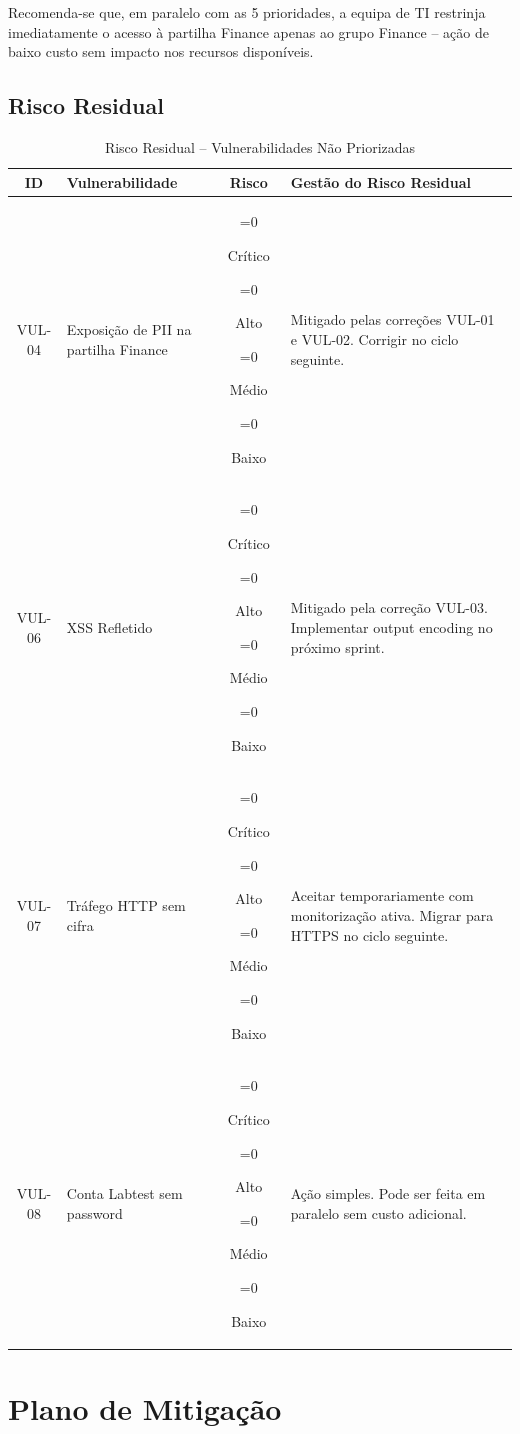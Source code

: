 \documentclass[12pt, a4paper]{report}
\newcommand{\risk}[1]{%
  \ifnum\pdfstrcmp{#1}{Critico}=0{\colorbox{Critical}{\color{white}\bfseries\footnotesize\strut~Crítico~}}\fi
  \ifnum\pdfstrcmp{#1}{Alto}=0{\colorbox{High}{\color{white}\bfseries\footnotesize\strut~Alto~}}\fi
  \ifnum\pdfstrcmp{#1}{Medio}=0{\colorbox{Medium}{\color{black}\bfseries\footnotesize\strut~Médio~}}\fi
  \ifnum\pdfstrcmp{#1}{Baixo}=0{\colorbox{Low}{\color{white}\bfseries\footnotesize\strut~Baixo~}}\fi}
\newcommand{\thead}[1]{\bfseries\small\color{white}#1}
\begin{document}
\begin{notebox}
Recomenda-se que, em paralelo com as 5 prioridades, a equipa de TI restrinja imediatamente
o acesso à partilha Finance apenas ao grupo Finance -- ação de baixo custo sem impacto nos
recursos disponíveis.
\end{notebox}

\section{Risco Residual}

\begin{table}[H]
\centering
\caption{Risco Residual -- Vulnerabilidades Não Priorizadas}
\begin{tabularx}{\linewidth}{c X c X}
\toprule
\rowcolor{TableHead}
\thead{ID} & \thead{Vulnerabilidade} & \thead{Risco} & \thead{Gestão do Risco Residual} \\
\midrule
VUL-04 & Exposição de PII na partilha Finance & \risk{Critico} &
  Mitigado pelas correções VUL-01 e VUL-02. Corrigir no ciclo seguinte. \\
\rowcolor{TableAlt}
VUL-06 & XSS Refletido & \risk{Alto} &
  Mitigado pela correção VUL-03. Implementar output encoding no próximo sprint. \\
VUL-07 & Tráfego HTTP sem cifra & \risk{Alto} &
  Aceitar temporariamente com monitorização ativa. Migrar para HTTPS no ciclo seguinte. \\
\rowcolor{TableAlt}
VUL-08 & Conta Labtest sem password & \risk{Alto} &
  Ação simples. Pode ser feita em paralelo sem custo adicional. \\
\bottomrule
\end{tabularx}
\end{table}

\chapter{Plano de Mitigação}
\end{document}
